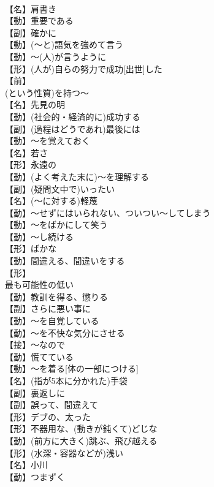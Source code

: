 \documentclass[8pt]{extreport}
\begin{document}
\begin{CJK}{UTF8}{min}
\\	【名】肩書き
\\	【動】重要である
\\	【副】確かに
\\	【動】(～と)語気を強めて言う
\\	【動】～(人)が言うように
\\	【形】(人が)自らの努力で成功[出世]した
\\	【前】
\\	(という性質)を持つ～
\\	【名】先見の明
\\	【動】(社会的・経済的に)成功する
\\	【副】(過程はどうであれ)最後には
\\	【動】～を覚えておく
\\	【名】若さ
\\	【形】永遠の
\\	【動】(よく考えた末に)～を理解する
\\	【副】(疑問文中で)いったい
\\	【名】(～に対する)軽蔑
\\	【動】～せずにはいられない、ついつい～してしまう
\\	【動】～をばかにして笑う
\\	【動】～し続ける
\\	【形】ばかな
\\	【動】間違える、間違いをする
\\	【形】
\\	最も可能性の低い
\\	【動】教訓を得る、懲りる
\\	【副】さらに悪い事に
\\	【動】～を自覚している
\\	【動】～を不快な気分にさせる
\\	【接】～なので
\\	【動】慌てている
\\	【動】～を着る[体の一部につける]
\\	【名】(指が5本に分かれた)手袋
\\	【副】裏返しに
\\	【副】誤って、間違えて
\\	【形】デブの、太った
\\	【形】不器用な、(動きが鈍くて)どじな
\\	【動】(前方に大きく)跳ぶ、飛び越える
\\	【形】(水深・容器などが)浅い
\\	【名】小川
\\	【動】つまずく

\end{CJK}
\end{document}
